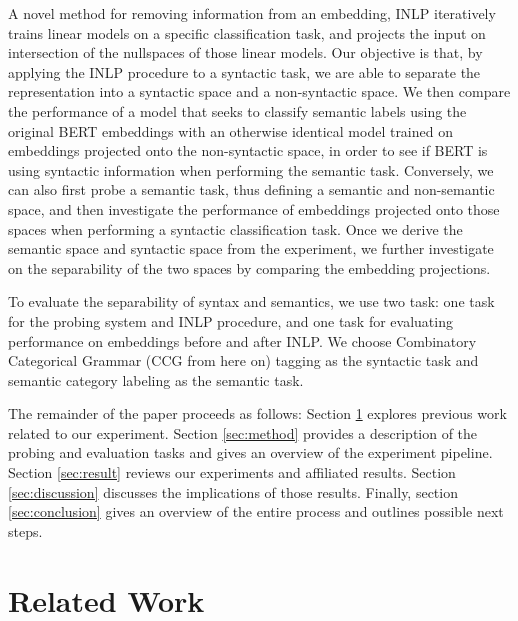\documentclass[11pt,a4paper]{article}
\begin{document}
A novel method for removing information from an embedding, INLP iteratively trains linear models on a specific classification task, and projects the input on intersection of the nullspaces of those linear models. Our objective is that, by applying the INLP procedure to a syntactic task, we are able to separate the representation into a syntactic space and a non-syntactic space. We then compare the performance of a model that seeks to classify semantic labels using the original BERT embeddings with an otherwise identical model trained on embeddings projected onto the non-syntactic space, in order to see if BERT is using syntactic information when performing the semantic task. Conversely, we can also first probe a semantic task, thus defining a semantic and non-semantic space, and then investigate the performance of embeddings projected onto those spaces when performing a syntactic classification task. Once we derive the semantic space and syntactic space from the experiment, we further investigate on the separability of the two spaces by comparing the embedding projections. %

To evaluate the separability of syntax and semantics, we use two task: one task for the probing system and INLP procedure, and one task for evaluating performance on embeddings before and after INLP. We choose Combinatory Categorical Grammar (CCG from here on) tagging \citep{ccg-bank} as the syntactic task and semantic category labeling \citep{propbank} as the semantic task. 

The remainder of the paper proceeds as follows: Section \ref{sec:related} explores previous work related to our experiment. Section \ref{sec:method} provides a description of the probing and evaluation tasks and gives an overview of the experiment pipeline. Section \ref{sec:result} reviews our experiments and affiliated results. Section \ref{sec:discussion} discusses the implications of those results. Finally, section \ref{sec:conclusion} gives an overview of the entire process and outlines possible next steps. 



\section{Related Work}
\label{sec:related}

\end{document}
